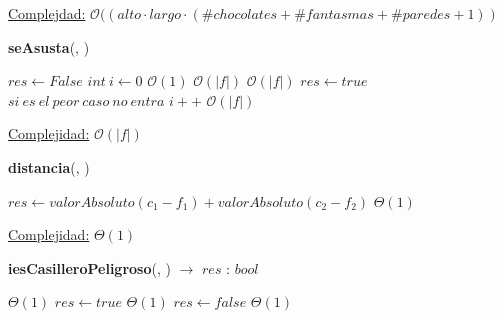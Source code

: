 \documentclass{book}
\newcommand{\bigO}{\mathcal{O}}
\begin{document}
\begin{Algoritmos}
\begin{algorithm}[H]
\begin{algorithmic}[1]
            \medskip
            \Statex
            \underline{Complejdad:} $\bigO((alto \cdot largo \cdot (\#chocolates + \#fantasmas + \#paredes + 1))$
            \end{algorithmic}
    \end{algorithm}

    \newpage

   
	\begin{algorithm}[H]{\textbf{seAsusta}(, )}
		
		\begin{algorithmic}[1]
			 \State $res\gets False$
			 \State $int\ i \gets 0$                               \Comment $\bigO(1)$
			                     \Comment $\bigO(|f|)$
			                                                            \Comment $\bigO(|f|)$
			 \State $res\gets true$                                     \Comment $si\ es \ el \ peor\ caso \ no \ entra$
			 \Else
			 \State $i++ $ 
			 \Comment $\bigO(|f|)$
			 \EndIf
			 \EndWhile
			 
			
			
			\medskip
			\Statex \underline{Complejidad:} $\bigO(|f|)$
		\end{algorithmic}
	\end{algorithm}


	 \begin{algorithm}[H]{\textbf{distancia}(, )}
		\begin{algorithmic}[1]
			\State $res \gets valorAbsoluto(c_1 - f_1) +  valorAbsoluto(c_2 - f_2)$                                                                 \Comment $\Theta(1)$
			
			\medskip
			\Statex \underline{Complejidad:} $\Theta(1)$
		\end{algorithmic}
	\end{algorithm}


	\begin{algorithm}[H]{\textbf{iesCasilleroPeligroso}(, ) $\to$ $res$ : $bool$}
			\begin{algorithmic}[1]
				                                                           \Comment $\Theta(1)$
				\State $res\gets true$                                     \Comment $\Theta(1)$
				\Else
				\State $res\gets false $ 
				\Comment $\Theta(1)$
				\EndIf
		

\end{algorithmic}
\end{algorithm}
\end{Algoritmos}
\end{document}
